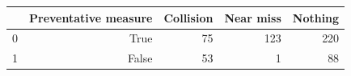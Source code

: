 \begin{tabular}{lrrrr}
\toprule
 & Preventative measure & Collision & Near miss & Nothing \\
\midrule
0 & True & 75 & 123 & 220 \\
1 & False & 53 & 1 & 88 \\
\bottomrule
\end{tabular}
